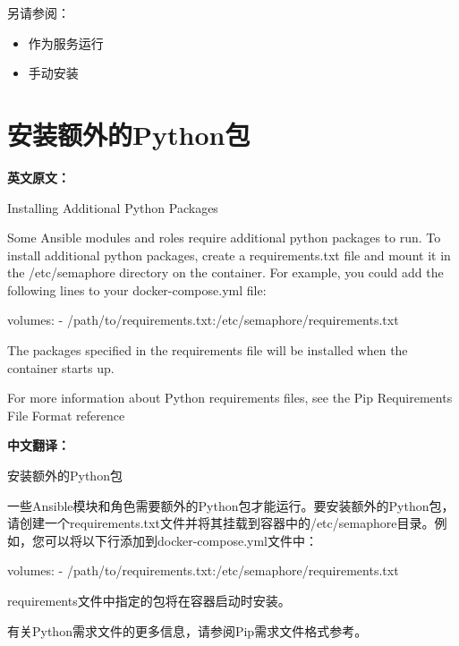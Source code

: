 \documentclass[12pt,UTF8]{ctexbook}
\begin{document}
另请参阅：

\begin{itemize}[leftmargin=3.5em]
    \item 作为服务运行
    \item 手动安装
\end{itemize}

\section{安装额外的Python包}

\textbf{英文原文：}

Installing Additional Python Packages 

Some Ansible modules and roles require additional python packages to run. To install additional python packages, create a requirements.txt file and mount it in the /etc/semaphore directory on the container. For example, you could add the following lines to your docker-compose.yml file: 

volumes: 
  - /path/to/requirements.txt:/etc/semaphore/requirements.txt 

The packages specified in the requirements file will be installed when the container starts up. 

For more information about Python requirements files, see the Pip Requirements File Format reference

\textbf{中文翻译：}

安装额外的Python包

一些Ansible模块和角色需要额外的Python包才能运行。要安装额外的Python包，请创建一个requirements.txt文件并将其挂载到容器中的/etc/semaphore目录。例如，您可以将以下行添加到docker-compose.yml文件中：

volumes: 
  - /path/to/requirements.txt:/etc/semaphore/requirements.txt 

requirements文件中指定的包将在容器启动时安装。

有关Python需求文件的更多信息，请参阅Pip需求文件格式参考。
\end{document}
